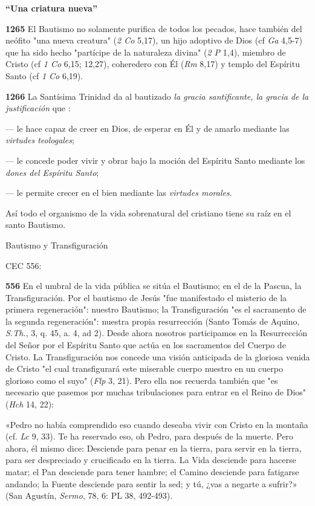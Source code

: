 \documentclass[]{article}
\begin{document}
\textbf{``Una criatura nueva''}

\textbf{1265} El Bautismo no solamente purifica de todos los pecados,
hace también del neófito "una nueva creatura" (\emph{2 Co} 5,17), un
hijo adoptivo de Dios (cf \emph{Ga} 4,5-7) que ha sido hecho "partícipe
de la naturaleza divina" (\emph{2 P} 1,4), miembro de Cristo (cf \emph{1
Co} 6,15; 12,27), coheredero con Él (\emph{Rm} 8,17) y templo del
Espíritu Santo (cf \emph{1 Co} 6,19).

\textbf{1266} La Santísima Trinidad da al bautizado \emph{la gracia
santificante, la gracia de la justificación} que :

--- le hace capaz de creer en Dios, de esperar en Él y de amarlo
mediante las \emph{virtudes teologales};

--- le concede poder vivir y obrar bajo la moción del Espíritu Santo
mediante los \emph{dones del Espíritu Santo};

--- le permite crecer en el bien mediante las \emph{virtudes morales}.

Así todo el organismo de la vida sobrenatural del cristiano tiene su
raíz en el santo Bautismo.

Bautismo y Transfiguración

CEC 556:

\textbf{556} En el umbral de la vida pública se sitúa el Bautismo; en el
de la Pascua, la Transfiguración. Por el bautismo de Jesús "fue
manifestado el misterio de la primera regeneración": nuestro Bautismo;
la Transfiguración "es el sacramento de la segunda regeneración":
nuestra propia resurrección (Santo Tomás de Aquino, \emph{S.Th.}, 3, q.
45, a. 4, ad 2). Desde ahora nosotros participamos en la Resurrección
del Señor por el Espíritu Santo que actúa en los sacramentos del Cuerpo
de Cristo. La Transfiguración nos concede una visión anticipada de la
gloriosa venida de Cristo "el cual transfigurará este miserable cuerpo
nuestro en un cuerpo glorioso como el suyo" (\emph{Flp} 3, 21). Pero
ella nos recuerda también que "es necesario que pasemos por muchas
tribulaciones para entrar en el Reino de Dios" (\emph{Hch} 14, 22):

«Pedro no había comprendido eso cuando deseaba vivir con Cristo en la
montaña (cf. \emph{Lc} 9, 33). Te ha reservado eso, oh Pedro, para
después de la muerte. Pero ahora, él mismo dice: Desciende para penar en
la tierra, para servir en la tierra, para ser despreciado y crucificado
en la tierra. La Vida desciende para hacerse matar; el Pan desciende
para tener hambre; el Camino desciende para fatigarse andando; la Fuente
desciende para sentir la sed; y tú, ¿vas a negarte a sufrir?» (San
Agustín, \emph{Sermo}, 78, 6: PL 38, 492-493).
\end{document}
